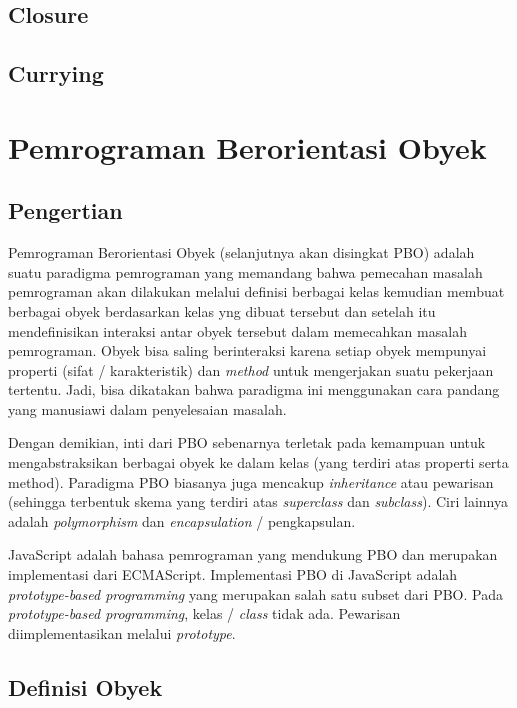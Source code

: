\subsection{Closure}

\subsection{Currying}


\section{Pemrograman Berorientasi Obyek}

\subsection{Pengertian}

Pemrograman Berorientasi Obyek (selanjutnya akan disingkat PBO) adalah suatu paradigma pemrograman yang memandang bahwa pemecahan masalah pemrograman akan dilakukan melalui definisi berbagai kelas kemudian membuat berbagai obyek berdasarkan kelas yng dibuat tersebut dan setelah itu mendefinisikan interaksi antar obyek tersebut dalam memecahkan masalah pemrograman. Obyek bisa saling berinteraksi karena setiap obyek mempunyai properti (sifat / karakteristik) dan \textit{method} untuk mengerjakan suatu pekerjaan tertentu. Jadi, bisa dikatakan bahwa paradigma ini menggunakan cara pandang yang manusiawi dalam penyelesaian masalah.

Dengan demikian, inti dari PBO sebenarnya terletak pada kemampuan untuk mengabstraksikan berbagai obyek ke dalam kelas (yang terdiri atas properti serta method). Paradigma PBO biasanya juga mencakup \textit{inheritance} atau pewarisan (sehingga terbentuk skema yang terdiri atas \textit{superclass} dan \textit{subclass}). Ciri lainnya adalah \textit{polymorphism} dan \textit{encapsulation} / pengkapsulan.

JavaScript adalah bahasa pemrograman yang mendukung PBO dan merupakan implementasi dari ECMAScript. Implementasi PBO di JavaScript adalah \textit{prototype-based programming} yang merupakan salah satu subset dari PBO. Pada \textit{prototype-based programming}, kelas / \textit{class} tidak ada. Pewarisan diimplementasikan melalui \textit{prototype}.

\subsection{Definisi Obyek}

